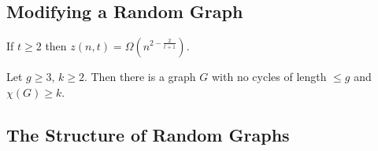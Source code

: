 \documentclass{article}
\begin{document}
\subsection{Modifying a Random Graph}













\begin{nthm}\label{thm:38}
    If $t \geq 2$ then $z(n,t) = \Omega(n^{2 - \frac{2}{t+1}})$.
\end{nthm}




\begin{nthm}\label{thm:39}
    Let $g \geq 3$, $k \geq 2$. Then there is a graph $G$ with no cycles of length $\leq g$ and $\chi(G) \geq k$.
\end{nthm}


{
}

\subsection{The Structure of Random Graphs}
\end{document}
